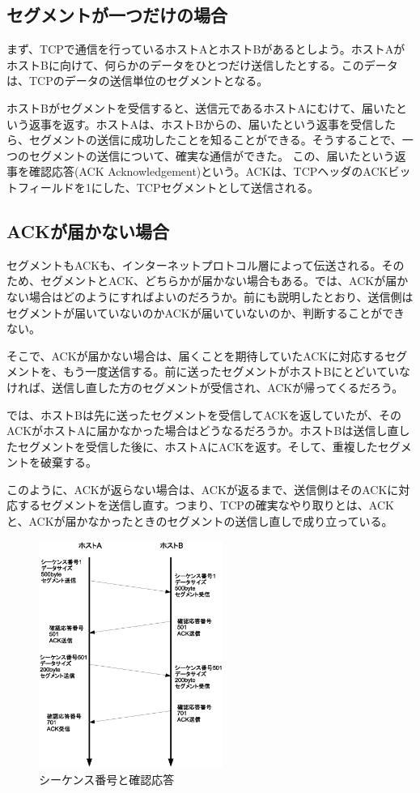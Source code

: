 \subsection{セグメントが一つだけの場合}

まず、TCPで通信を行っているホストAとホストBがあるとしよう。ホストAがホストBに向けて、何らかのデータをひとつだけ送信したとする。このデータは、TCPのデータの送信単位のセグメントとなる。

ホストBがセグメントを受信すると、送信元であるホストAにむけて、届いたという返事を返す。ホストAは、ホストBからの、届いたという返事を受信したら、セグメントの送信に成功したことを知ることができる。そうすることで、一つのセグメントの送信について、確実な通信ができた。
この、届いたという返事を確認応答(ACK Acknowledgement)という。ACKは、TCPヘッダのACKビットフィールドを1にした、TCPセグメントとして送信される。

\subsection{ACKが届かない場合}

セグメントもACKも、インターネットプロトコル層によって伝送される。そのため、セグメントとACK、どちらかが届かない場合もある。では、ACKが届かない場合はどのようにすればよいのだろうか。前にも説明したとおり、送信側はセグメントが届いていないのかACKが届いていないのか、判断することができない。

そこで、ACKが届かない場合は、届くことを期待していたACKに対応するセグメントを、もう一度送信する。前に送ったセグメントがホストBにとどいていなければ、送信し直した方のセグメントが受信され、ACKが帰ってくるだろう。

では、ホストBは先に送ったセグメントを受信してACKを返していたが、そのACKがホストAに届かなかった場合はどうなるだろうか。ホストBは送信し直したセグメントを受信した後に、ホストAにACKを返す。そして、重複したセグメントを破棄する。

このように、ACKが返らない場合は、ACKが返るまで、送信側はそのACKに対応するセグメントを送信し直す。つまり、TCPの確実なやり取りとは、ACKと、ACKが届かなかったときのセグメントの送信し直しで成り立っている。

\begin{figure}
	\includegraphics[width=6cm, clip]{draw/tcp02n.eps}
	\caption{シーケンス番号と確認応答}
	\label{fig:tcp02}
\end{figure}

